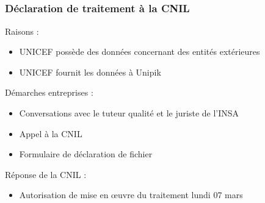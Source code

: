\subsection{} 

\begin{frame}
\frametitle{Déclaration de traitement à la CNIL}
	Raisons : 
	\begin{itemize}
		\item UNICEF possède des données concernant des entités extérieures
		\item UNICEF fournit les données à Unipik
	\end{itemize}
	
	Démarches entreprises :
	\begin{itemize}
		\item Conversations avec le tuteur qualité et le juriste de l'INSA
		\item Appel à la CNIL
		\item Formulaire de déclaration de fichier 
	\end{itemize}
	
	Réponse de la CNIL :
	\begin{itemize}
		\item Autorisation de mise en œuvre du traitement lundi 07 mars
	\end{itemize}
	
\end{frame}